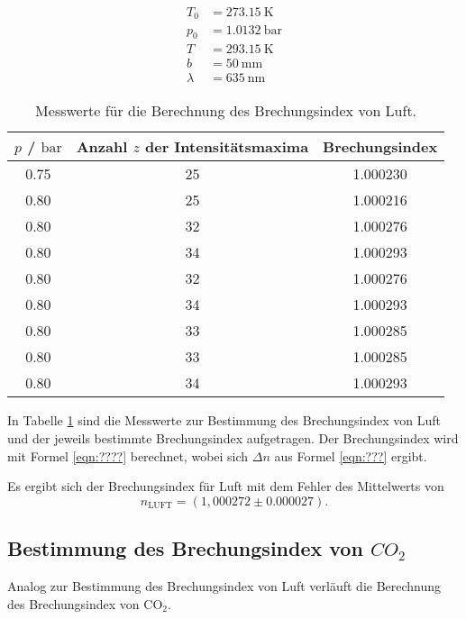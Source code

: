 \begin{align}
	T_0 &= \SI{273,15}{\kelvin} \\
	p_0 &= \SI{1,0132}{\bar}  \\
	T &= \SI{293,15}{\kelvin} \\
	b &= \SI{50}{\milli\meter} \\
	\lambda &= \SI{635}{\nano\meter}
\end{align}



\begin{table}
	\caption{Messwerte für die Berechnung des Brechungsindex von Luft.}
	\label{tab:luftbrech}
	\centering
	\begin{tabular}{ccc}
	\toprule
	$p$ / $\si{\bar}$ & Anzahl $z$ der Intensitätsmaxima & Brechungsindex \\
	\midrule
		0.75 & 25 & 1.000230 \\
		0.80 & 25 & 1.000216 \\
		0.80 & 32 & 1.000276 \\
		0.80 & 34 & 1.000293 \\
		0.80 & 32 & 1.000276 \\
		0.80 & 34 & 1.000293 \\
		0.80 & 33 & 1.000285 \\
		0.80 & 33 & 1.000285 \\
		0.80 & 34 & 1.000293 \\
	\bottomrule
	\end{tabular}
\end{table}

In Tabelle \ref{tab:luftbrech} sind die Messwerte zur Bestimmung des Brechungsindex von Luft
und der jeweils bestimmte Brechungsindex aufgetragen. 
Der Brechungsindex wird mit Formel \eqref{eqn:????} berechnet, wobei sich $\Delta n$ aus Formel 
\eqref{eqn:???} ergibt.

Es ergibt sich der Brechungsindex für Luft mit dem Fehler des Mittelwerts von
\begin{equation}
	n_{\mathrm{LUFT}} = (1,000272 \pm 0.000027) \mathrm{.}
\end{equation}


\subsection{Bestimmung des Brechungsindex von \texorpdfstring{$CO_2$}{math} }

Analog zur Bestimmung des Brechungsindex von Luft verläuft die Berechnung des 
Brechungsindex von CO$_2$.

